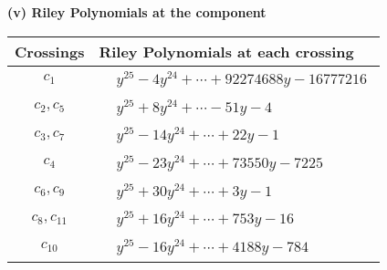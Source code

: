 \documentclass[1p]{elsarticle_modified}
\theoremstyle{definition}
\begin{document}
\flushleft \textbf{(v) Riley Polynomials at the component}\newline \\
\begin{tabular}{m{50pt}|m{274pt}}
Crossings & \hspace{64pt}Riley Polynomials at each crossing \\
\hline $$\begin{aligned}c_{1}\end{aligned}$$&$\begin{aligned}
&y^{25}-4 y^{24}+\cdots+92274688 y-16777216
\end{aligned}$\\
\hline $$\begin{aligned}c_{2},c_{5}\end{aligned}$$&$\begin{aligned}
&y^{25}+8 y^{24}+\cdots-51 y-4
\end{aligned}$\\
\hline $$\begin{aligned}c_{3},c_{7}\end{aligned}$$&$\begin{aligned}
&y^{25}-14 y^{24}+\cdots+22 y-1
\end{aligned}$\\
\hline $$\begin{aligned}c_{4}\end{aligned}$$&$\begin{aligned}
&y^{25}-23 y^{24}+\cdots+73550 y-7225
\end{aligned}$\\
\hline $$\begin{aligned}c_{6},c_{9}\end{aligned}$$&$\begin{aligned}
&y^{25}+30 y^{24}+\cdots+3 y-1
\end{aligned}$\\
\hline $$\begin{aligned}c_{8},c_{11}\end{aligned}$$&$\begin{aligned}
&y^{25}+16 y^{24}+\cdots+753 y-16
\end{aligned}$\\
\hline $$\begin{aligned}c_{10}\end{aligned}$$&$\begin{aligned}
&y^{25}-16 y^{24}+\cdots+4188 y-784
\end{aligned}$\\
\hline
\end{tabular}\\~\\
\end{document}
